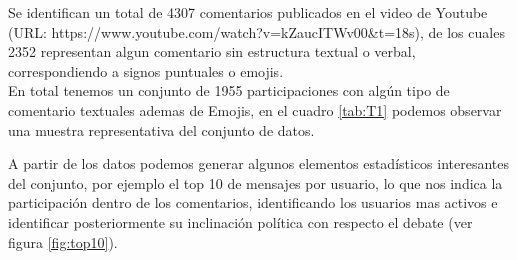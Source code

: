 Se identifican un total de 4307 comentarios publicados en el video de Youtube (URL: https://www.youtube.com/watch?v=kZaucITWv00&t=18s), de los cuales 2352 representan algun comentario sin estructura textual o verbal, correspondiendo a signos puntuales o emojis.\\

En total tenemos un conjunto de 1955 participaciones con algún tipo de comentario textuales ademas de Emojis, en el cuadro \ref{tab:T1} podemos observar una muestra representativa del conjunto de datos. \\

\begin{table}[H]
	\centering
	\caption{}
	\label{tab:T1}
\end{table}

A partir de los datos podemos generar algunos elementos estadísticos interesantes del conjunto, por ejemplo el top 10 de mensajes por usuario, lo que nos indica la participación dentro de los comentarios, identificando los usuarios mas activos e identificar posteriormente su inclinación política con respecto el debate (ver figura \ref{fig:top10}).\\


